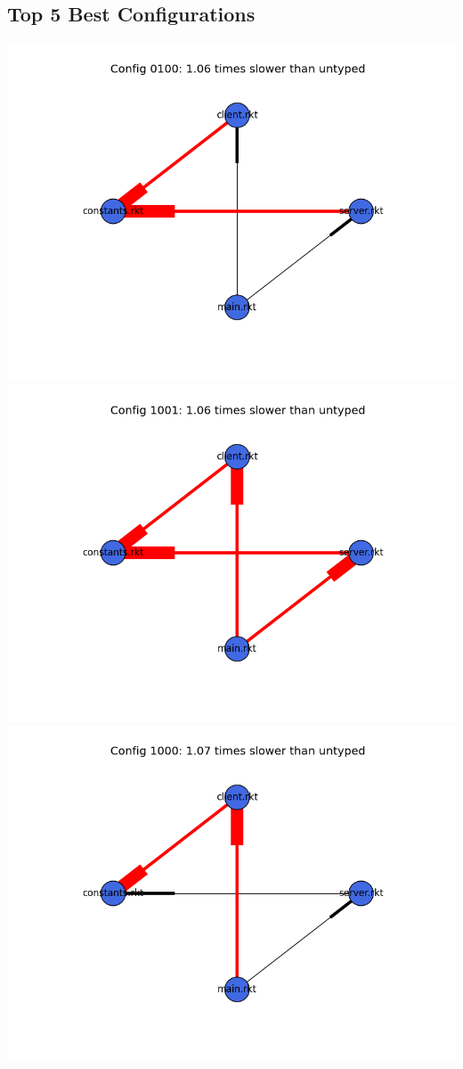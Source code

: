 \documentclass{article}
\begin{document}
\begin{itemize}
\subsection{Top 5 Best Configurations}
\includegraphics[width=\textwidth]{echo-module-graph-0100.png}
\includegraphics[width=\textwidth]{echo-module-graph-1001.png}
\includegraphics[width=\textwidth]{echo-module-graph-1000.png}

\end{itemize}
\end{document}
